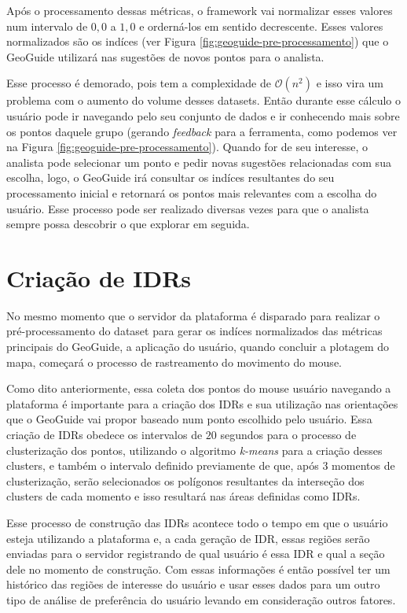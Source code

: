 Após o processamento dessas métricas, o framework vai normalizar esses valores num intervalo de $0,0$ a $1,0$ e orderná-los em sentido decrescente. Esses valores normalizados são os indíces (ver Figura \ref{fig:geoguide-pre-processamento}) que o GeoGuide utilizará nas sugestões de novos pontos para o analista.

Esse processo é demorado, pois tem a complexidade de $\mathcal{O}(n^{2})$ e isso vira um problema com o aumento do volume desses datasets. Então durante esse cálculo o usuário pode ir navegando pelo seu conjunto de dados e ir conhecendo mais sobre os pontos daquele grupo (gerando \textit{feedback} para a ferramenta, como podemos ver na Figura \ref{fig:geoguide-pre-processamento}). Quando for de seu interesse, o analista pode selecionar um ponto e pedir novas sugestões relacionadas com sua escolha, logo, o GeoGuide irá consultar os indíces resultantes do seu processamento inicial e retornará os pontos mais relevantes com a escolha do usuário. Esse processo pode ser realizado diversas vezes para que o analista sempre possa descobrir o que explorar em seguida.

\section{Criação de IDRs}

No mesmo momento que o servidor da plataforma é disparado para realizar o pré-processamento do dataset para gerar os indíces normalizados das métricas principais do GeoGuide, a aplicação do usuário, quando concluir a plotagem do mapa, começará o processo de rastreamento do movimento do mouse.

Como dito anteriormente, essa coleta dos pontos do mouse usuário navegando a plataforma é importante para a criação dos IDRs e sua utilização nas orientações que o GeoGuide vai propor baseado num ponto escolhido pelo usuário. Essa criação de IDRs obedece os intervalos de $20$ segundos para o processo de clusterização dos pontos, utilizando o algoritmo \textit{k-means} para a criação desses clusters, e também o intervalo definido previamente de que, após $3$ momentos de clusterização, serão selecionados os polígonos resultantes da interseção dos clusters de cada momento e isso resultará nas áreas definidas como IDRs.

Esse processo de construção das IDRs acontece todo o tempo em que o usuário esteja utilizando a plataforma e, a cada geração de IDR, essas regiões serão enviadas para o servidor registrando de qual usuário é essa IDR e qual a seção dele no momento de construção. Com essas informações é então possível ter um histórico das regiões de interesse do usuário e usar esses dados para um outro tipo de análise de preferência do usuário levando em consideração outros fatores.

